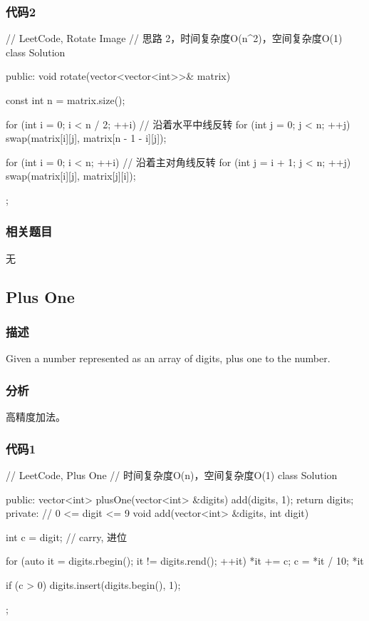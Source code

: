 \subsubsection{代码2}
\begin{Code}
// LeetCode, Rotate Image
// 思路 2，时间复杂度O(n^2)，空间复杂度O(1)
class Solution {
public:
    void rotate(vector<vector<int>>& matrix) {
        const int n = matrix.size();

        for (int i = 0; i < n / 2; ++i) // 沿着水平中线反转
            for (int j = 0; j < n; ++j)
                swap(matrix[i][j], matrix[n - 1 - i][j]);

        for (int i = 0; i < n; ++i)  // 沿着主对角线反转
            for (int j = i + 1; j < n; ++j)
                swap(matrix[i][j], matrix[j][i]);
    }
};
\end{Code}


\subsubsection{相关题目}
\begindot
\item 无
\myenddot


\subsection{Plus One} %
\label{sec:plus-one}


\subsubsection{描述}
Given a number represented as an array of digits, plus one to the number.


\subsubsection{分析}
高精度加法。


\subsubsection{代码1}
\begin{Code}
// LeetCode, Plus One
// 时间复杂度O(n)，空间复杂度O(1)
class Solution {
public:
    vector<int> plusOne(vector<int> &digits) {
        add(digits, 1);
        return digits;
    }
private:
    // 0 <= digit <= 9
    void add(vector<int> &digits, int digit) {
        int c = digit;  // carry, 进位

        for (auto it = digits.rbegin(); it != digits.rend(); ++it) {
            *it += c;
            c = *it / 10;
            *it %
        }

        if (c > 0) digits.insert(digits.begin(), 1);
    }
};
\end{Code}


